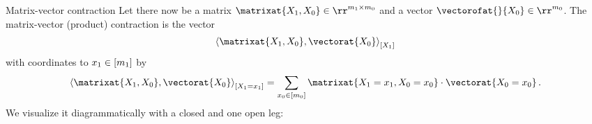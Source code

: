 \documentclass{beamer}
\begin{document}
    \begin{frame}{Matrix-vector contraction}
        Let there now be a matrix $\matrixat{\catvariableof{1},\catvariableof{0}}\in\rr^{\catdimof{1}\times\catdimof{0}}$ and a vector $\vectorofat{}{\catvariableof{0}}\in\rr^{\catdimof{0}}$.
        The matrix-vector (product) contraction is the vector
        \begin{align*}
            \contractionof{\matrixat{\catvariableof{1},\catvariableof{0}},\vectorat{\catvariableof{0}}}{\catvariableof{1}}
        \end{align*}
        with coordinates to $x_{1}\in[m_{1}]$ by
        \begin{align*}
            \contractionof{\matrixat{\catvariableof{1},\catvariableof{0}},\vectorat{\catvariableof{0}}}{\indexedcatvariableof{1}}
            =\sum_{\catindexofin{0}} \matrixat{\indexedcatvariableof{1},\indexedcatvariableof{0}} \cdot \vectorat{\indexedcatvariableof{0}} \, .
        \end{align*}
        We visualize it diagrammatically with a closed and one open leg:

    \end{frame}
\end{document}
